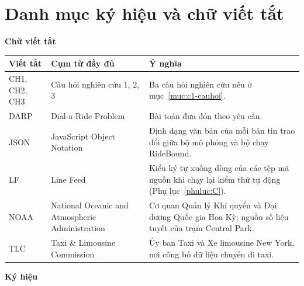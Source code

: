 \chapter*{Danh mục ký hiệu và chữ viết tắt}

\vspace{4pt}
\noindent\textbf{Chữ viết tắt}
\vspace{4pt}

\begin{longtable}{@{}p{2.6cm}p{4.6cm}p{7.6cm}@{}}
\toprule
\textbf{Viết tắt} & \textbf{Cụm từ đầy đủ} & \textbf{Ý nghĩa}\\
\midrule
\endhead
CH1, CH2, CH3 & Câu hỏi nghiên cứu 1, 2, 3 & Ba câu hỏi nghiên cứu nêu ở mục~\ref{muc:c1-cauhoi}.\\
DARP & Dial-a-Ride Problem & Bài toán đưa đón theo yêu cầu.\\
JSON & JavaScript Object Notation & Định dạng văn bản của mỗi bản tin trao đổi giữa bộ mô phỏng và bộ chạy
RideBound.\\
LF & Line Feed & Kiểu ký tự xuống dòng của các tệp mã nguồn khi chạy lại kiểm thử tự động
(Phụ lục~\ref{phuluc:C}).\\
NOAA & National Oceanic and Atmospheric Administration & Cơ quan Quản lý Khí quyển và Đại dương Quốc gia Hoa Kỳ;
nguồn số liệu tuyết của trạm Central Park.\\
TLC & Taxi \& Limousine Commission & Ủy ban Taxi và Xe limousine New York, nơi công bố dữ liệu chuyến đi
taxi.\\
\bottomrule
\end{longtable}

\vspace{8pt}
\noindent\textbf{Ký hiệu}
\vspace{4pt}

